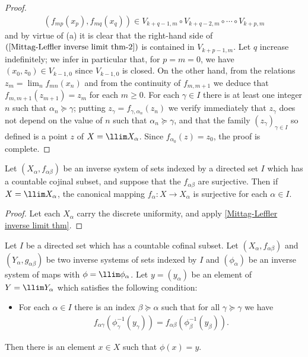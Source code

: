 \begin{proof}
\begin{align}
(f_{mp}(x_p),f_{mq}(x_{q}))\in V_{k+q-1,m}\circ V_{k+q-2,m}\circ\cdots\circ V_{k+p,m}
\end{align}
and by virtue of (a) it is clear that the right-hand side of $(\ref{Mittag-Leffler inverse limit thm-2})$ is contained in $V_{k+p-1,m}$. Let $q$ increase indefinitely; we infer in particular that, for $p=m=0$, we have $(x_0,z_0)\in V_{k-1,0}$ since $V_{k-1,0}$ is closed. On the other hand, from the relations $z_m=\lim_nf_{mn}(x_n)$ and from the continuity  of $f_{m,m+1}$ we deduce that $f_{m,m+1}(z_{m+1})=z_m$ for each $m\geq 0$. For each $\gamma\in I$ there is at least one integer $n$ such that $\alpha_n\succeq\gamma$; putting $z_\gamma=f_{\gamma,\alpha_n}(z_n)$ we verify immediately that $z_\gamma$ does not depend on the value of $n$ such that $\alpha_n\succeq\gamma$, and that the family $(z_\gamma)_{\gamma\in I}$ so defined is a point $z$ of $X=\llim X_\alpha$. Since $f_{\alpha_0}(z)=z_0$, the proof is complete.
\end{proof}
\begin{corollary}\label{set inverse limit countable cofinal surjective}
Let $(X_\alpha,f_{\alpha\beta})$ be an inverse system of sets indexed by a directed set $I$ which has a countable cojinal subset, and suppose that the $f_{\alpha\beta}$ are surjective. Then if $X=\llim X_\alpha$, the canonical mapping $f_\alpha:X\to X_\alpha$ is surjective for each $\alpha\in I$.
\end{corollary}
\begin{proof}
Let each $X_\alpha$ carry the discrete uniformity, and apply \cref{Mittag-Leffler inverse limit thm}.
\end{proof}
\begin{corollary}\label{set inverse limit countable cofinal inverse imaege}
Let $I$ be a directed set which has a countable cofinal subset. Let $(X_\alpha,f_{\alpha\beta})$ and $(Y_\alpha,g_{\alpha\beta})$ be two inverse systems of sets indexed by $I$ and $(\phi_\alpha)$ be an inverse system of maps with $\phi=\llim\phi_\alpha$. Let $y=(y_\alpha)$ be an element of $Y=\llim Y_\alpha$ which satisfies the following condition:
\begin{itemize}
\item For each $\alpha\in I$ there is an index $\beta\succeq\alpha$ such that for all $\gamma\succeq\gamma$ we have
\begin{align*}
f_{\alpha\gamma}(\phi_\gamma^{-1}(y_\gamma))=f_{\alpha\beta}(\phi_\beta^{-1}(y_\beta)).
\end{align*}
\end{itemize}
Then there is an element $x\in X$ such that $\phi(x)=y$.
\end{corollary}
